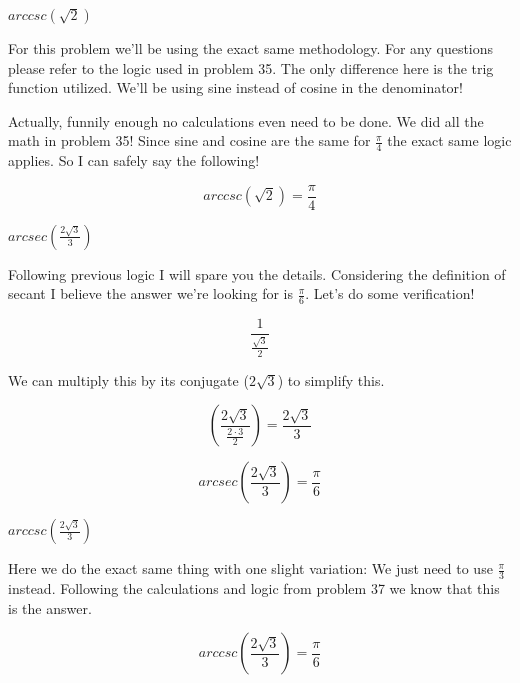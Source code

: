 \documentclass[10pt,letterpaper]{amspset}
\begin{document}
\begin{problem}[36]
    $arccsc(\sqrt{2})$
\end{problem}

\begin{solution}
    For this problem we'll be using the exact same methodology. For any questions please refer to the logic used in problem 35. The only difference here is the trig function utilized. We'll be using sine instead of cosine in the denominator! 
    
    Actually, funnily enough no calculations even need to be done. We did all the math in problem 35! Since sine and cosine are the same for $\frac{\pi}{4}$ the exact same logic applies. So I can safely say the following! 
    
     \[\boxed{ arccsc(\sqrt{2}) = \frac{\pi}{4} }\]
\end{solution}


\begin{problem}[37]
    $arcsec \left( \frac{2\sqrt{3}}{3} \right)$
\end{problem}

\begin{solution}
    Following previous logic I will spare you the details. Considering the definition of secant I believe the answer we're looking for is $\frac{\pi}{6}$. Let's do some verification! 
    
    \[ \frac{1}{ \frac{\sqrt{3}}{2}  } \] 
    
    We can multiply this by its conjugate ($2\sqrt{3}$) to simplify this. 
    
    \[ \left( \frac{2\sqrt{3}} {\frac{2 \cdot 3}{2}} \right) = \frac{2\sqrt{3}}{3} \]
    
    \[\boxed{ arcsec \left( \frac{2\sqrt{3}}{3} \right)= \frac{\pi}{6} }\]
\end{solution}


\pagebreak


\begin{problem}[38]
    $arccsc \left( \frac{2\sqrt{3}}{3} \right)$
\end{problem}

\begin{solution}
    Here we do the exact same thing with one slight variation: We just need to use $\frac{\pi}{3}$ instead. Following the calculations and logic from problem 37 we know that this is the answer.
    
    \[\boxed{ arccsc \left( \frac{2\sqrt{3}}{3} \right)= \frac{\pi}{6} }\]
\end{solution}
\end{document}
